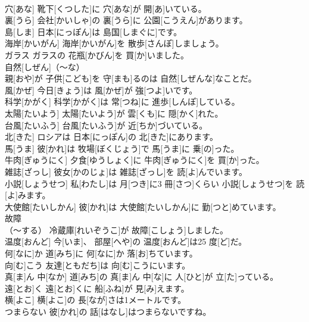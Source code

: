 \documentclass[8pt]{extreport}
\begin{document}
\begin{CJK}{UTF8}{min}
\\	穴[あな]	靴下[くつした]に 穴[あな]が 開[あ]いている。		
\\	裏[うら]	会社[かいしゃ]の 裏[うら]に 公園[こうえん]があります。		
\\	島[しま]	日本[にっぽん]は 島国[しまぐに]です。		
\\	海岸[かいがん]	海岸[かいがん]を 散歩[さんぽ]しましょう。		
\\	ガラス	ガラスの 花瓶[かびん]を 買[か]いました。		
\\	自然[しぜん]（～な）
\\	親[おや]が 子供[こども]を 守[まも]るのは 自然[しぜんな]なことだ。		
\\	風[かぜ]	今日[きょう]は 風[かぜ]が 強[つよ]いです。		
\\	科学[かがく]	科学[かがく]は 常[つね]に 進歩[しんぽ]している。		
\\	太陽[たいよう]	太陽[たいよう]が 雲[くも]に 隠[かく]れた。		
\\	台風[たいふう]	台風[たいふう]が 近[ちか]づいている。		
\\	北[きた]	ロシアは 日本[にっぽん]の 北[きた]にあります。		
\\	馬[うま]	彼[かれ]は 牧場[ぼくじょう]で 馬[うま]に 乗[の]った。		
\\	牛肉[ぎゅうにく]	夕食[ゆうしょく]に 牛肉[ぎゅうにく]を 買[か]った。		
\\	雑誌[ざっし]	彼女[かのじょ]は 雑誌[ざっし]を 読[よ]んでいます。		
\\	小説[しょうせつ]	私[わたし]は 月[つき]に3 冊[さつ]くらい 小説[しょうせつ]を 読[よ]みます。		
\\	大使館[たいしかん]	彼[かれ]は 大使館[たいしかん]に 勤[つと]めています。		
\\	故障
\\	[こしょう]（～する）	冷蔵庫[れいぞうこ]が 故障[こしょう]しました。		
\\	温度[おんど]	今[いま]、 部屋[へや]の 温度[おんど]は25 度[ど]だ。		
\\	何[なに]か	道[みち]に 何[なに]か 落[お]ちています。		
\\	向[む]こう	友達[ともだち]は 向[む]こうにいます。		
\\	真[ま]ん 中[なか]	道[みち]の 真[ま]ん 中[な]に 人[ひと]が 立[た]っている。		
\\	遠[とお]く	遠[とお]くに 船[ふね]が 見[み]えます。		
\\	横[よこ]	横[よこ]の 長[なが]さは1メートルです。		
\\	つまらない	彼[かれ]の 話[はなし]はつまらないですね。		

\end{CJK}
\end{document}
